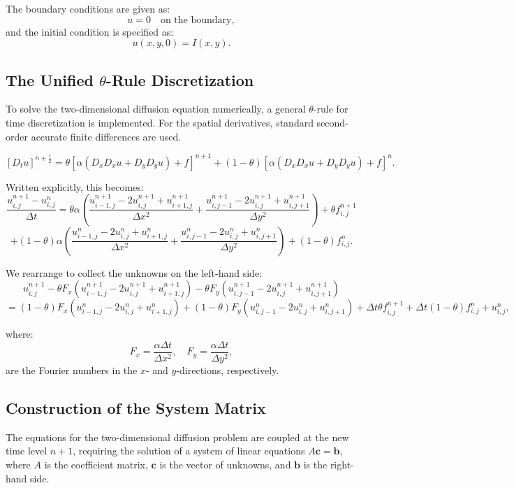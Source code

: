 \documentclass{article}
\begin{document}
		The boundary conditions are given as:
		\[
		u = 0 \quad \text{on the boundary},
		\]
		and the initial condition is specified as:
		\[
		u(x, y, 0) = I(x, y).
		\]
		
		\subsection{The Unified \(\theta\)-Rule Discretization}
		
			To solve the two-dimensional diffusion equation numerically, a general \(\theta\)-rule for time discretization is implemented. For the spatial derivatives, standard second-order accurate finite differences are used.
			
			\[
			\left[ D_t u \right]^{n+\frac{1}{2}} = \theta \left[ \alpha \left( D_x D_x u + D_y D_y u \right) + f \right]^{n+1}
			+ (1 - \theta) \left[ \alpha \left( D_x D_x u + D_y D_y u \right) + f \right]^n.
			\]
			
			Written explicitly, this becomes:
			\[
			\frac{u_{i,j}^{n+1} - u_{i,j}^n}{\Delta t} =
			\theta \alpha \left( \frac{u_{i-1,j}^{n+1} - 2u_{i,j}^{n+1} + u_{i+1,j}^{n+1}}{\Delta x^2} 
			+ \frac{u_{i,j-1}^{n+1} - 2u_{i,j}^{n+1} + u_{i,j+1}^{n+1}}{\Delta y^2} \right) 
			+ \theta f_{i,j}^{n+1}
			\]
			\[
			+ (1 - \theta) \alpha \left( \frac{u_{i-1,j}^n - 2u_{i,j}^n + u_{i+1,j}^n}{\Delta x^2}
			+ \frac{u_{i,j-1}^n - 2u_{i,j}^n + u_{i,j+1}^n}{\Delta y^2} \right)
			+ (1 - \theta) f_{i,j}^n.
			\]
			
			We rearrange to collect the unknowns on the left-hand side:
			\[
			u_{i,j}^{n+1} - \theta F_x \left( u_{i-1,j}^{n+1} - 2u_{i,j}^{n+1} + u_{i+1,j}^{n+1} \right)
			- \theta F_y \left( u_{i,j-1}^{n+1} - 2u_{i,j}^{n+1} + u_{i,j+1}^{n+1} \right)
			\]
			\[
			= (1 - \theta) F_x \left( u_{i-1,j}^n - 2u_{i,j}^n + u_{i+1,j}^n \right)
			+ (1 - \theta) F_y \left( u_{i,j-1}^n - 2u_{i,j}^n + u_{i,j+1}^n \right)
			+ \Delta t \theta f_{i,j}^{n+1} + \Delta t (1 - \theta) f_{i,j}^n + u_{i,j}^n,
			\]
			
			
			where:
			\[
			F_x = \frac{\alpha \Delta t}{\Delta x^2}, \quad F_y = \frac{\alpha \Delta t}{\Delta y^2},
			\]
			are the Fourier numbers in the \(x\)- and \(y\)-directions, respectively.
		
		\subsection{Construction of the System Matrix}
		
			The equations for the two-dimensional diffusion problem are coupled at the new time level \( n+1 \), requiring the solution of a system of linear equations \( A \mathbf{c} = \mathbf{b} \), where \( A \) is the coefficient matrix, \( \mathbf{c} \) is the vector of unknowns, and \( \mathbf{b} \) is the right-hand side.
			
\end{document}
